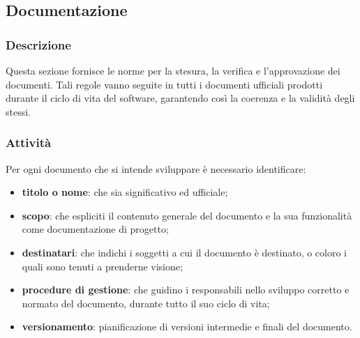 \subsection{Documentazione}
    \subsubsection{Descrizione}
      Questa sezione fornisce le norme per la stesura, la verifica e l'approvazione dei documenti. Tali regole vanno seguite in tutti i documenti ufficiali prodotti durante il ciclo di vita del software, garantendo così la coerenza e la validità degli stessi.

	\subsubsection{Attività}
	  Per ogni documento che si intende sviluppare è necessario identificare:
	  \begin{itemize}
	  	\item \textbf{titolo o nome}: che sia significativo ed ufficiale;
	  	\item \textbf{scopo}: che espliciti il contenuto generale del documento e la sua funzionalità come documentazione di progetto;
	  	\item \textbf{destinatari}: che indichi i soggetti a cui il documento è destinato, o coloro i quali sono tenuti a prenderne visione;
	  	\item \textbf{procedure di gestione}: che guidino i responsabili nello sviluppo corretto e normato del documento, durante tutto il suo ciclo di vita;
	  	\item \textbf{versionamento}: pianificazione di versioni intermedie e finali del documento.
	  \end{itemize}


